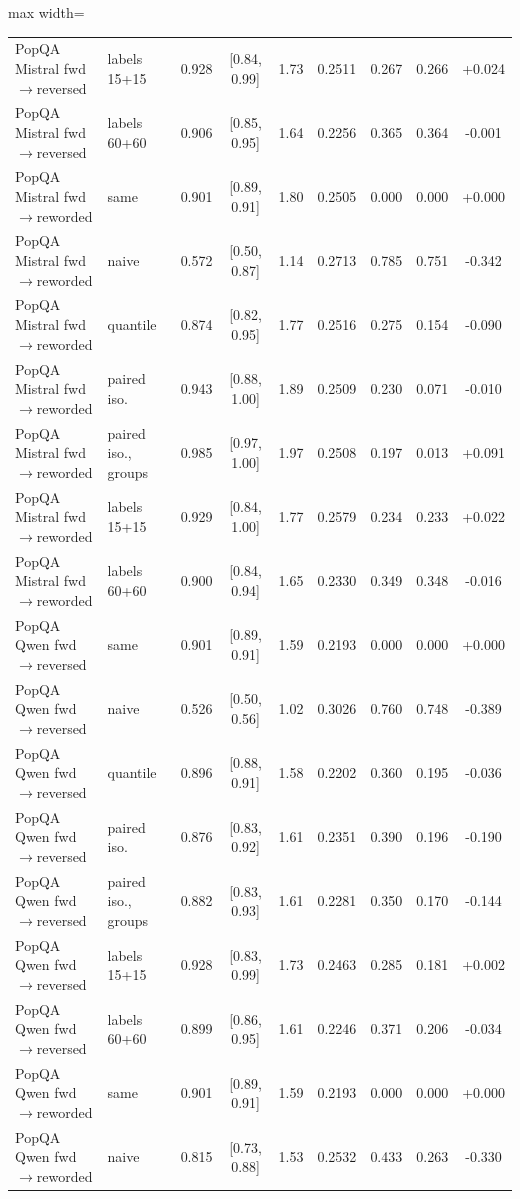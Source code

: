 \documentclass[twoside]{article}
\theoremstyle{definition}
\theoremstyle{remark}
\newcommand{\1}{\mathbf{1}}
\begin{document}
\begin{table}[t]
\begin{adjustbox}{max width=\textwidth}
\begin{tabular}{llccccccc}
PopQA Mistral fwd$\to$reversed & labels 15+15 & 0.928 & [0.84, 0.99] & 1.73 & 0.2511 & 0.267 & 0.266 & +0.024\\
PopQA Mistral fwd$\to$reversed & labels 60+60 & 0.906 & [0.85, 0.95] & 1.64 & 0.2256 & 0.365 & 0.364 & -0.001\\
\midrule
PopQA Mistral fwd$\to$reworded & same & 0.901 & [0.89, 0.91] & 1.80 & 0.2505 & 0.000 & 0.000 & +0.000\\
PopQA Mistral fwd$\to$reworded & naive & 0.572 & [0.50, 0.87] & 1.14 & 0.2713 & 0.785 & 0.751 & -0.342\\
PopQA Mistral fwd$\to$reworded & quantile & 0.874 & [0.82, 0.95] & 1.77 & 0.2516 & 0.275 & 0.154 & -0.090\\
PopQA Mistral fwd$\to$reworded & paired iso. & 0.943 & [0.88, 1.00] & 1.89 & 0.2509 & 0.230 & 0.071 & -0.010\\
PopQA Mistral fwd$\to$reworded & paired iso., groups & 0.985 & [0.97, 1.00] & 1.97 & 0.2508 & 0.197 & 0.013 & +0.091\\
PopQA Mistral fwd$\to$reworded & labels 15+15 & 0.929 & [0.84, 1.00] & 1.77 & 0.2579 & 0.234 & 0.233 & +0.022\\
PopQA Mistral fwd$\to$reworded & labels 60+60 & 0.900 & [0.84, 0.94] & 1.65 & 0.2330 & 0.349 & 0.348 & -0.016\\
\midrule
PopQA Qwen fwd$\to$reversed & same & 0.901 & [0.89, 0.91] & 1.59 & 0.2193 & 0.000 & 0.000 & +0.000\\
PopQA Qwen fwd$\to$reversed & naive & 0.526 & [0.50, 0.56] & 1.02 & 0.3026 & 0.760 & 0.748 & -0.389\\
PopQA Qwen fwd$\to$reversed & quantile & 0.896 & [0.88, 0.91] & 1.58 & 0.2202 & 0.360 & 0.195 & -0.036\\
PopQA Qwen fwd$\to$reversed & paired iso. & 0.876 & [0.83, 0.92] & 1.61 & 0.2351 & 0.390 & 0.196 & -0.190\\
PopQA Qwen fwd$\to$reversed & paired iso., groups & 0.882 & [0.83, 0.93] & 1.61 & 0.2281 & 0.350 & 0.170 & -0.144\\
PopQA Qwen fwd$\to$reversed & labels 15+15 & 0.928 & [0.83, 0.99] & 1.73 & 0.2463 & 0.285 & 0.181 & +0.002\\
PopQA Qwen fwd$\to$reversed & labels 60+60 & 0.899 & [0.86, 0.95] & 1.61 & 0.2246 & 0.371 & 0.206 & -0.034\\
\midrule
PopQA Qwen fwd$\to$reworded & same & 0.901 & [0.89, 0.91] & 1.59 & 0.2193 & 0.000 & 0.000 & +0.000\\
PopQA Qwen fwd$\to$reworded & naive & 0.815 & [0.73, 0.88] & 1.53 & 0.2532 & 0.433 & 0.263 & -0.330\\

\end{tabular}
\end{adjustbox}
\end{table}
\end{document}
